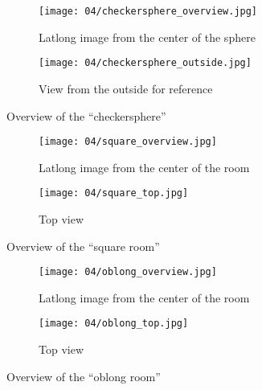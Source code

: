 \begin{figure}[p]
\centering
    \hfill
    \begin{subfigure}[t]{0.7\textwidth}
            \centering
            \texttt{[image: 04/checkersphere\_overview.jpg]}
            \caption{Latlong image from the center of the sphere}
    \end{subfigure}%
    \hfill
    \begin{subfigure}[t]{0.3\textwidth}
            \centering
            \texttt{[image: 04/checkersphere\_outside.jpg]}
            \caption{View from the outside for reference}
    \end{subfigure}
    \hfill
  \caption{Overview of the ``checkersphere''}
  \label{fig:checkersphere}
\end{figure}

\begin{figure}[p]
\centering
    \hfill
    \begin{subfigure}[b]{0.7\textwidth}
            \centering
            \texttt{[image: 04/square\_overview.jpg]}
            \caption{Latlong image from the center of the room}
    \end{subfigure}%
    \hfill
    \begin{subfigure}[b]{0.3\textwidth}
            \centering
            \texttt{[image: 04/square\_top.jpg]}
            \caption{Top view}
    \end{subfigure}
    \hfill
  \caption{Overview of the ``square room''}
  \label{fig:square_room}
\end{figure}

\begin{figure}[p]
\centering
    \hfill
    \begin{subfigure}[b]{0.7\textwidth}
            \centering
            \texttt{[image: 04/oblong\_overview.jpg]}
            \caption{Latlong image from the center of the room}
    \end{subfigure}%
    \hfill
    \begin{subfigure}[b]{0.3\textwidth}
            \centering
            \texttt{[image: 04/oblong\_top.jpg]}
            \caption{Top view}
    \end{subfigure}
    \hfill
  \caption{Overview of the ``oblong room''}
  \label{fig:oblong_room}
\end{figure}

